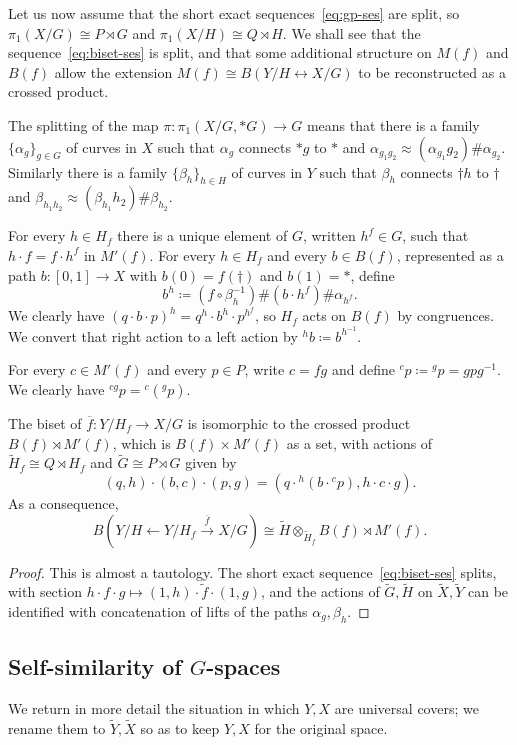 \documentclass{amsart}
\newcommand\wtf{{\widetilde f}}
\newcommand\wtG{{\widetilde G}}
\newcommand\wtH{{\widetilde H}}
\begin{document}
Let us now assume that the short exact sequences~\eqref{eq:gp-ses} are
split, so $\pi_1(X/G)\cong P\rtimes G$ and
$\pi_1(X/H)\cong Q\rtimes H$. We shall see that the
sequence~\eqref{eq:biset-ses} is split, and that some additional
structure on $M(f)$ and $B(f)$ allow the extension
$M(f)\cong B(Y/H\leftrightarrow X/G)$ to be reconstructed as a crossed
product.

The splitting of the map $\pi\colon\pi_1(X/G,*G)\to G$ means that
there is a family $\{\alpha_g\}_{g\in G}$ of curves in $X$ such that
$\alpha_g$ connects $*g$ to $*$ and
$\alpha_{g_1g_2}\approx(\alpha_{g_1}g_2)\#\alpha_{g_2}$. Similarly
there is a family $\{\beta_h\}_{h\in H}$ of curves in $Y$ such that
$\beta_h$ connects $\dagger h$ to $\dagger$ and
$\beta_{h_1h_2}\approx(\beta_{h_1}h_2)\#\beta_{h_2}$.

For every $h\in H_f$ there is a unique element of $G$, written
$h^f\in G$, such that $h\cdot f= f\cdot h^f$ in $M'(f)$. For every
$h\in H_f$ and every $b\in B(f)$, represented as a path
$b\colon[0,1]\to X$ with $b(0)=f(\dagger)$ and $b(1)=*$, define
\[b^h\coloneqq(f\circ\beta_h^{-1})\#(b\cdot h^f)\#\alpha_{h^f}.
\]
We clearly have $(q\cdot b\cdot p)^h=q^h\cdot b^h\cdot p^{h^f}$, so
$H_f$ acts on $B(f)$ by congruences. We convert that right action to a
left action by ${}^h b\coloneqq b^{h^{-1}}$.

For every $c\in M'(f)$ and every $p\in P$, write $c=f g$ and define
${}^c p\coloneqq {}^g p=g p g^{-1}$. We clearly have
${}^{c g}p={}^c({}^g p)$.
\begin{lem}
\label{lem:cross prod str}
  The biset of $\overline f\colon Y/H_f\to X/G$ is isomorphic to the
  crossed product $B(f)\rtimes M'(f)$, which is $B(f)\times M'(f)$ as
  a set, with actions of $\wtH_f\cong Q\rtimes H_f$ and
  $\wtG\cong P\rtimes G$ given by
  \[(q,h)\cdot(b,c)\cdot(p,g)=(q\cdot{}^h(b\cdot{}^c p),h\cdot c\cdot g).\]
  As a consequence,
  \[B(Y/H \leftarrow Y/H_f\overset{\overline f}\to X/G) \cong \wtH\otimes _{\wtH_f} B(f)\rtimes M'(f).\]
\end{lem}
\begin{proof}
  This is almost a tautology. The short exact
  sequence~\eqref{eq:biset-ses} splits, with section
  $h\cdot f\cdot g\mapsto(1,h)\cdot\wtf\cdot(1,g)$, and the actions of
  $\wtG,\wtH$ on $\widetilde X,\widetilde Y$ can be identified with
  concatenation of lifts of the paths $\alpha_g,\beta_h$.
\end{proof}

\subsection{Self-similarity of \boldmath $G$-spaces}
We return in more detail the situation in which $Y,X$ are universal
covers; we rename them to $\widetilde Y,\widetilde X$ so as to keep
$Y,X$ for the original space.
\end{document}
